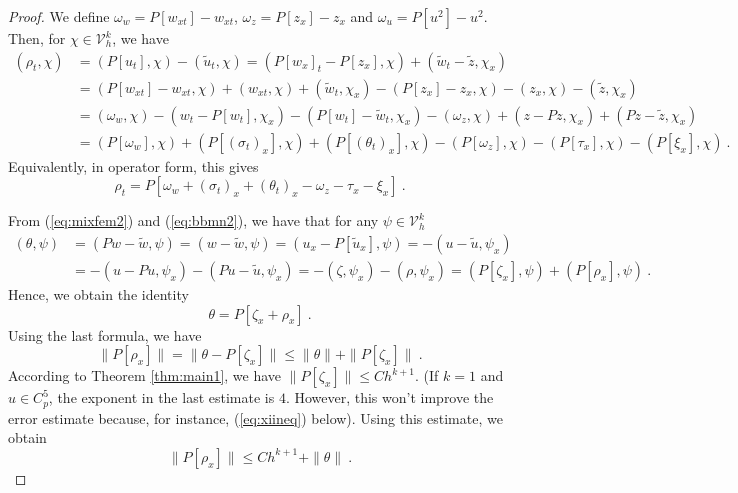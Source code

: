 \documentclass[10pt,a4paper]{amsart}
\begin{document}
\begin{proof}
We define $\omega_w=P[w_{xt}]-w_{xt}$, $\omega_z=P[z_x]-z_x$ and $\omega_u=P[u^2]-u^2$. Then, for $\chi\in\mathcal{V}_h^k$, we have 
$$
\begin{aligned}
    (\rho_t,\chi) &= (P[u_t],\chi)-(\tilde{u}_t,\chi)= (P[w_x]_t-P [z_x],\chi) + (\tilde{w}_t-\tilde{z},\chi_x)\\
 &=(P[w_{xt}]-w_{xt},\chi)+(w_{xt},\chi)+(\tilde{w}_t,\chi_x)-(P[z_x]-z_x,\chi)-(z_x,\chi)-(\tilde{z},\chi_x)\\
 &=(\omega_w,\chi)-(w_t-P[w_t],\chi_x)-(P[w_t]-\tilde{w}_t,\chi_x)-(\omega_z,\chi)+(z-Pz,\chi_x)+(Pz-\tilde{z},\chi_x)\\
 &=(P[\omega_w],\chi)+(P[{(\sigma_t)}_x],\chi)+(P[{(\theta_t)}_x],\chi)-(P[\omega_z],\chi)-(P[\tau_x],\chi)-(P[\xi_x],\chi)\ .
\end{aligned}
$$
Equivalently, in operator form, this gives
\begin{equation}\label{eq:rhot}
\rho_t=P[\omega_w+(\sigma_t)_x+(\theta_t)_x-\omega_z-\tau_x-\xi_x]\ .
\end{equation}

From (\ref{eq:mixfem2}) and (\ref{eq:bbmn2}), we have that for any $\psi\in\mathcal{V}_h^k$
$$
\begin{aligned}
(\theta,\psi)&=(Pw-\tilde{w},\psi) = (w-\tilde{w},\psi)= (u_x-P[\tilde{u}_x],\psi)
= -(u-\tilde{u},\psi_x)\\
&= -(u-Pu,\psi_x)-(Pu-\tilde{u},\psi_x)
=  -(\zeta,\psi_x)-(\rho,\psi_x)=  (P[\zeta_x],\psi)+(P[\rho_x],\psi)\ .
\end{aligned}$$
Hence, we obtain the identity
\begin{equation}\label{eq:thetaP}
\theta=P[\zeta_x+\rho_x]\ .
\end{equation}
%
Using the last formula, we have
%
$$
\|P[\rho_x]\| =\|\theta-P[\zeta_x]\|\leq \|\theta\|+\|P[\zeta_x]\|\ .
$$
According to Theorem \ref{thm:main1}, we have $\|P[\zeta_x]\|\leq Ch^{k+1}$. (If $k=1$ and $u\in C_p^5$, the exponent in the last estimate is $4$. However, this won’t improve the error estimate because, for instance, (\ref{eq:xiineq}) below). 
%
Using this estimate, we obtain
\begin{equation}\label{eq:Prhox}
\|P[\rho_x]\|\leq Ch^{k+1}+\|\theta\|\ .
\end{equation}


\end{proof}
\end{document}
